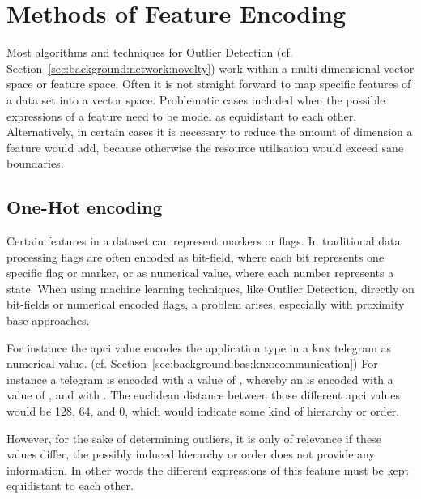 
\section{Methods of Feature Encoding}
\label{sec:background:network:features}

Most algorithms and techniques for Outlier Detection (cf. Section~\ref{sec:background:network:novelty}) work within a multi-dimensional vector space or feature space. Often it is not straight forward to map specific features of a data set into a vector space.
Problematic cases included when the possible expressions of a feature need to be model as equidistant to each other.
Alternatively, in certain cases it is necessary to reduce the amount of dimension a feature would add, because otherwise the resource utilisation would exceed sane boundaries.

\subsection{One-Hot encoding}
\label{sec:background:network:features:onehot}

Certain features in a dataset can represent markers or flags. In traditional data processing flags are often encoded as bit-field, where each bit represents one specific flag or marker, or as numerical value, where each number represents a state.
When using machine learning techniques, like Outlier Detection, directly on bit-fields or numerical encoded flags, a problem arises, especially with proximity base approaches.

For instance the \gls{apci} value encodes the application type in a \gls{knx} telegram as numerical value. (cf. Section~\ref{sec:background:bas:knx:communication})
For instance a  telegram is encoded with a value of , whereby an  is encoded with a value of , and  with .
The euclidean distance between those different \gls{apci} values would be 128, 64, and 0, which would indicate some kind of hierarchy or order.

However, for the sake of determining outliers, it is only of relevance if these values differ, the possibly induced hierarchy or order does not provide any information.
In other words the different expressions of this feature must be kept equidistant to each other.

